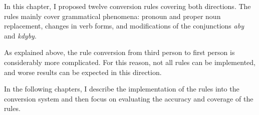 In this chapter, I proposed twelve conversion rules covering both directions. The rules mainly cover grammatical phenomena: pronoun and proper noun replacement, changes in verb forms, and modifications of the conjunctions \emph{aby} and \emph{kdyby}.

As explained above, the rule conversion from third person to first person is considerably more complicated. For this reason, not all rules can be implemented, and worse results can be expected in this direction.

In the following chapters, I describe the implementation of the rules into the conversion system and then focus on evaluating the accuracy and coverage of the rules.

